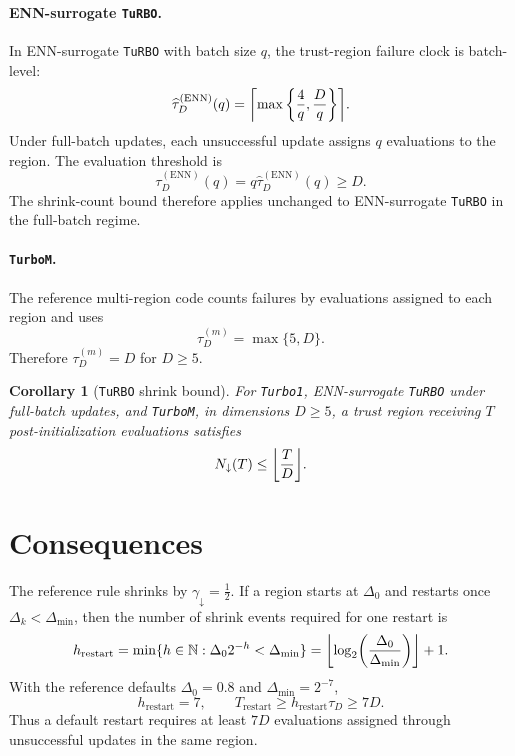 \documentclass[10pt]{article}
\numberwithin{equation}{section}
\newcommand{\TuRBO}{\textnormal{\texttt{TuRBO}}}
\newcommand{\TurboOne}{\textnormal{\texttt{Turbo1}}}
\newcommand{\TurboM}{\textnormal{\texttt{TurboM}}}
\newcommand{\N}{\mathbb{N}}
\DeclarePairedDelimiter{\floor}{\lfloor}{\rfloor}
\DeclarePairedDelimiter{\ceil}{\lceil}{\rceil}
\theoremstyle{plain}
\newtheorem{corollary}{Corollary}
\theoremstyle{definition}
\theoremstyle{remark}
\begin{document}
\paragraph{ENN-surrogate \TuRBO.}
In ENN-surrogate \TuRBO{} with batch size \(q\), the trust-region failure
clock is batch-level:
\begin{equation}
  \widehat{\tau}^{(\mathrm{ENN})}_D(q)
  =
  \ceil*{
    \max\left\{\frac{4}{q},\frac{D}{q}\right\}
  } .
  \label{eq:turbo-enn-failure-tolerance}
\end{equation}
Under full-batch updates, each unsuccessful update assigns \(q\) evaluations to
the region.  The evaluation threshold is
\begin{equation}
  \tau_D^{(\mathrm{ENN})}(q)
  =
  q\widehat{\tau}^{(\mathrm{ENN})}_D(q)
  \ge D .
  \label{eq:turbo-enn-evaluation-threshold}
\end{equation}
The shrink-count bound therefore applies unchanged to ENN-surrogate \TuRBO{} in
the full-batch regime.

\paragraph{\TurboM.}
The reference multi-region code counts failures by evaluations assigned to each
region and uses \cite{turboM}
\begin{equation}
  \tau_D^{(m)}=\max\{5,D\}.
  \label{eq:turbo-m-failure-tolerance}
\end{equation}
Therefore \(\tau_D^{(m)}=D\) for \(D\ge5\).

\begin{corollary}[\TuRBO{} shrink bound]
For \TurboOne{}, ENN-surrogate \TuRBO{} under full-batch updates, and
\TurboM{}, in dimensions \(D\ge5\), a trust region receiving \(T\)
post-initialization evaluations satisfies
\begin{equation}
  N_{\downarrow}(T)
  \le
  \floor*{\frac{T}{D}} .
  \label{eq:turbo-bound}
\end{equation}
\end{corollary}

\section{Consequences}

The reference rule shrinks by \(\gamma_{\downarrow}=\frac{1}{2}\).  If a region
starts at \(\Delta_0\) and restarts once \(\Delta_k<\Delta_{\min}\), then the
number of shrink events required for one restart is
\begin{equation}
  h_{\mathrm{restart}}
  =
  \min\{h\in\N:\Delta_0 2^{-h}<\Delta_{\min}\}
  =
  \floor*{\log_2\!\left(\frac{\Delta_0}{\Delta_{\min}}\right)}+1.
  \label{eq:restart-height}
\end{equation}
With the reference defaults \(\Delta_0=0.8\) and \(\Delta_{\min}=2^{-7}\),
\[
  h_{\mathrm{restart}}=7,
  \qquad
  T_{\mathrm{restart}}
  \ge
  h_{\mathrm{restart}}\tau_D
  \ge
  7D .
\]
Thus a default restart requires at least \(7D\) evaluations assigned through
unsuccessful updates in the same region.
\end{document}
